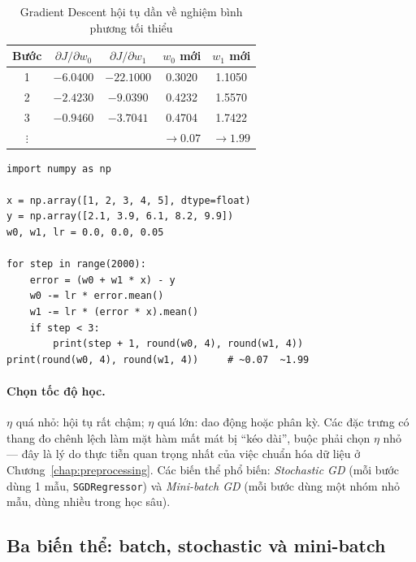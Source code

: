 \begin{table}[H]
\centering
\begin{tabular}{|c|c|c|c|c|}
\hline
\textbf{Bước} & $\partial J / \partial w_0$ & $\partial J / \partial w_1$ & $w_0$ mới & $w_1$ mới \\
\hline
1 & $-6.0400$ & $-22.1000$ & 0.3020 & 1.1050 \\ \hline
2 & $-2.4230$ & $-9.0390$ & 0.4232 & 1.5570 \\ \hline
3 & $-0.9460$ & $-3.7041$ & 0.4704 & 1.7422 \\ \hline
$\vdots$ & & & $\to 0.07$ & $\to 1.99$ \\ \hline
\end{tabular}
\caption{Gradient Descent hội tụ dần về nghiệm bình phương tối thiểu}
\end{table}

\begin{lstlisting}[caption={Cài đặt Gradient Descent cho hồi quy tuyến tính}]
import numpy as np

x = np.array([1, 2, 3, 4, 5], dtype=float)
y = np.array([2.1, 3.9, 6.1, 8.2, 9.9])
w0, w1, lr = 0.0, 0.0, 0.05

for step in range(2000):
    error = (w0 + w1 * x) - y
    w0 -= lr * error.mean()
    w1 -= lr * (error * x).mean()
    if step < 3:
        print(step + 1, round(w0, 4), round(w1, 4))
print(round(w0, 4), round(w1, 4))     # ~0.07  ~1.99
\end{lstlisting}

\paragraph{Chọn tốc độ học.} $\eta$ quá nhỏ: hội tụ rất chậm; $\eta$ quá lớn: dao động hoặc phân kỳ. Các đặc trưng có thang đo chênh lệch làm mặt hàm mất mát bị ``kéo dài'', buộc phải chọn $\eta$ nhỏ --- đây là lý do thực tiễn quan trọng nhất của việc chuẩn hóa dữ liệu ở Chương~\ref{chap:preprocessing}. Các biến thể phổ biến: \textit{Stochastic GD} (mỗi bước dùng 1 mẫu, \texttt{SGDRegressor}) và \textit{Mini-batch GD} (mỗi bước dùng một nhóm nhỏ mẫu, dùng nhiều trong học sâu).


\subsection{Ba biến thể: batch, stochastic và mini-batch}
\label{sec:gd-variants}


